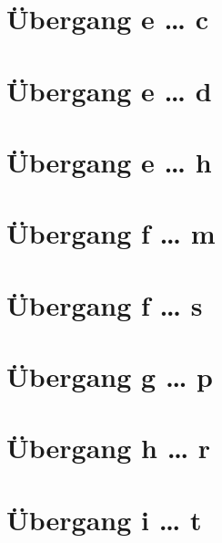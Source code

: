\documentclass[a4paper,landscape]{article}
\begin{document}
\hspace*{-1ex}
\newpage

\section{Übergang e … c }

\hspace*{-1ex}
\newpage

\section{Übergang e … d }

\hspace*{-1ex}
\newpage

\section{Übergang e … h }

\hspace*{-1ex}
\newpage

\section{Übergang f … m }

\hspace*{-1ex}
\newpage

\section{Übergang f … s }

\hspace*{-1ex}
\newpage

\section{Übergang g … p }

\hspace*{-1ex}
\newpage

\section{Übergang h … r }

\hspace*{-1ex}
\newpage

\section{Übergang i … t }
\end{document}

